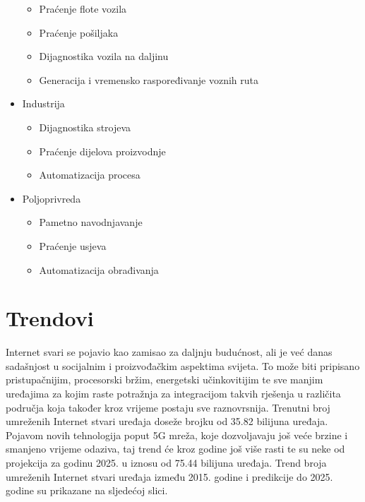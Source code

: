 \documentclass[times, utf8, diplomski]{fer}
\begin{document}
\begin{itemize}
    \begin{itemize}
        \item Praćenje flote vozila
        \item Praćenje pošiljaka
        \item Dijagnostika vozila na daljinu
        \item Generacija i vremensko raspoređivanje voznih ruta
    \end{itemize}
    \item Industrija
    \begin{itemize}
        \item Dijagnostika strojeva
        \item Praćenje dijelova proizvodnje
        \item Automatizacija procesa
    \end{itemize}
    \item Poljoprivreda
    \begin{itemize}
        \item Pametno navodnjavanje
        \item Praćenje usjeva
        \item Automatizacija obrađivanja
    \end{itemize}
\end{itemize}

\section{Trendovi}
Internet svari se pojavio kao zamisao za daljnju budućnost, ali je već danas sadašnjost u socijalnim i proizvođačkim aspektima svijeta. To može biti pripisano pristupačnijim, procesorski bržim, energetski učinkovitijim te sve manjim uređajima za kojim raste potražnja za integracijom takvih rješenja u različita područja koja također kroz vrijeme postaju sve raznovrsnija. Trenutni broj umreženih Internet stvari uređaja doseže brojku od 35.82 bilijuna uređaja. Pojavom novih tehnologija poput 5G mreža, koje dozvoljavaju još veće brzine i smanjeno vrijeme odaziva, taj trend će kroz godine još više rasti te su neke od projekcija za godinu 2025. u iznosu od 75.44 bilijuna uređaja\citep{IotNumber}. Trend broja umreženih Internet stvari uređaja između 2015. godine i predikcije do 2025. godine su prikazane na sljedećoj slici. 
\end{document}
